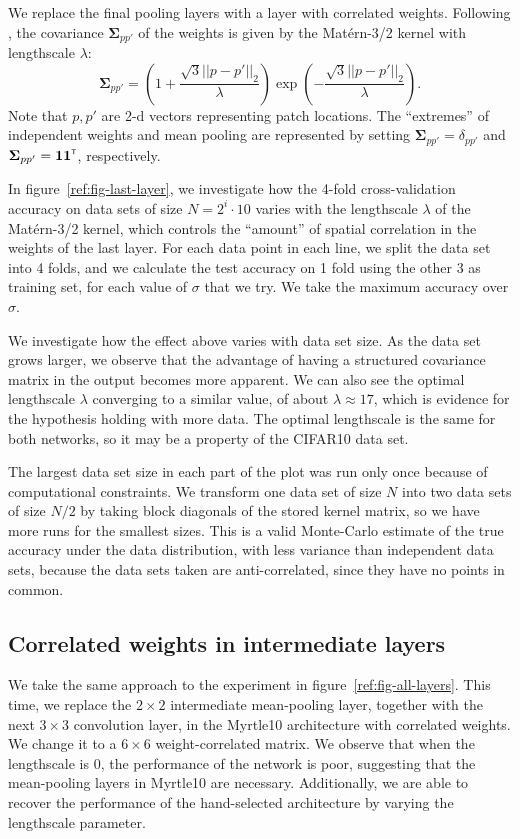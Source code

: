 \documentclass[tablecaption=bottom,wcp,nonatbib]{jmlr} %
\newcommand{\vSigma}{\boldsymbol{\Sigma}}
\newcommand{\tp}{{\mathrm{\textsf{\tiny T}}}}
\newcommand{\bracket}[3]{{\left#1 #3 \right#2}}
\newcommand{\bra}{\bracket{(}{)}}
\begin{document}
We replace the final pooling layers with a layer with correlated weights. Following \citet{dutordoir2020}, the covariance $\vSigma_{pp'}$ of the weights is given by the Matérn-3/2 kernel with lengthscale $\lambda$:
\begin{equation}
    \vSigma_{pp'} = \bra{1 + \frac{\sqrt{3}||p - p'||_2}{\lambda}} \exp\bra{-\frac{\sqrt{3}||p - p'||_2}{\lambda}}.
\end{equation}
Note that $p,p'$ are 2-d vectors representing patch locations. The ``extremes'' of independent weights and mean pooling are represented by setting $\vSigma_{pp'} = \delta_{pp'}$ and $\vSigma_{pp'} = {\boldsymbol 1\boldsymbol 1}^\tp$, respectively.

In figure~\ref{ref:fig-last-layer}, we investigate how the 4-fold cross-validation accuracy on data sets of size $N=2^i \cdot 10$ varies with the lengthscale $\lambda$ of the Matérn-3/2 kernel, which controls the ``amount'' of spatial correlation in the weights of the last layer. For each data point in each line, we split the data set into 4 folds, and we calculate the test accuracy on 1 fold using the other 3 as training set, for each value of $\sigma$ that we try. We take the maximum accuracy over $\sigma$.

We investigate how the effect above varies with data set size. As the data set grows larger, we observe that the advantage of having a structured covariance matrix in the output becomes more apparent. We can also see the optimal lengthscale $\lambda$  converging to a similar value, of about $\lambda \approx 17$, which is evidence for the hypothesis holding with more data. The optimal lengthscale is the same for both networks, so it may be a property of the CIFAR10 data set.

The largest data set size in each part of the plot was run only once because of computational constraints. We transform one data set of size $N$ into two data sets of size $N/2$ by taking block diagonals of the stored kernel matrix, so we have more runs for the smallest sizes. This is a valid Monte-Carlo estimate of the true accuracy under the data distribution, with less variance than independent data sets, because the data sets taken are anti-correlated, since they have no points in common.

\subsection{Correlated weights in intermediate layers}
We take the same approach to the experiment in figure~\ref{ref:fig-all-layers}. This time, we replace the $2\times 2$ intermediate mean-pooling layer, together with the next $3\times 3$ convolution layer, in the Myrtle10 architecture with correlated weights. We change it to a $6 \times 6$ weight-correlated matrix. We observe that when the lengthscale is 0, the performance of the network is poor, suggesting that the mean-pooling layers in Myrtle10 are necessary. Additionally, we are able to recover the performance of the hand-selected architecture by varying the lengthscale parameter.
\end{document}
